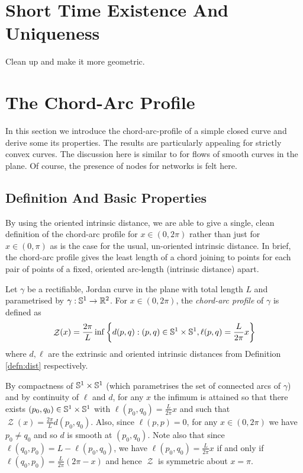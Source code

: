 \documentclass[11pt]{amsart}
\DeclareMathOperator{\chordarcprofile}{\mathcal{Z}}
\begin{document}
\section{Short Time Existence And Uniqueness}
\label{sec:orgheadline6}
Clean up \cite{MR1240580} and make it more geometric.
\section{The Chord-Arc Profile}
\label{sec:orgheadline10}

In this section we introduce the chord-arc-profile of a simple closed curve and derive some its properties. The results are particularly appealing for strictly convex curves. The discussion here is similar to \cite{alpha_csf_dist_comp} for flows of smooth curves in the plane. Of course, the presence of nodes for networks is felt here.

\subsection{Definition And Basic Properties}
\label{sec:orgheadline7}

By using the oriented intrinsic distance, we are able to give a single, clean definition of the chord-arc profile for \(x \in (0, 2\pi)\) rather than just for \(x \in (0, \pi)\) as is the case for the usual, un-oriented intrinsic distance. In brief, the chord-arc profile gives the least length of a chord joining to points for each pair of points of a fixed, oriented arc-length (intrinsic distance) apart.

\begin{defn}
Let \(\gamma\) be a rectifiable, Jordan curve in the plane with total length \(L\) and parametrised by \(\gamma: \mathbb{S}^1 \to \mathbb{R}^2\). For \(x\in (0, 2\pi)\), the \emph{chord-arc profile} of \(\gamma\) is defined as
\[
\chordarcprofile (x) = \frac{2\pi}{L} \inf\left\{d(p, q): (p,q) \in \sphere^1\times\sphere^1, \ell(p,q) = \frac{L}{2\pi} x\right\}
\]
where \(d, \ell\) are the extrinsic and oriented intrinsic distances from Definition \ref{defn:dist} respectively.
\end{defn}

\begin{remark}
By compactness of \(\mathbb{S}^1\times \mathbb{S}^1\) (which parametrises the set of connected arcs of \(\gamma\)) and by continuity of \(\ell\) and \(d\), for any \(x\) the infimum is attained so that there exists \((p_0,q_0) \in \mathbb{S}^1 \times \mathbb{S}^1\) with \(\ell(p_0, q_0) = \frac{L}{2\pi}x\) and such that \(\chordarcprofile(x) = \frac{2\pi}{L} d(p_0, q_0)\). Also, since \(\ell(p,p) = 0\), for any \(x\in(0,2\pi)\) we have \(p_0 \ne q_0\) and so \(d\) is smooth at \((p_0, q_0)\). Note also that since \(\ell(q_0, p_0) = L - \ell(p_0, q_0)\), we have \(\ell(p_0, q_0) = \tfrac{L}{2\pi}x\) if and only if \(\ell(q_0, p_0) = \frac{L}{2\pi}(2\pi - x)\) and hence \(\chordarcprofile\) is symmetric about \(x = \pi\).
\end{remark}
\end{document}
